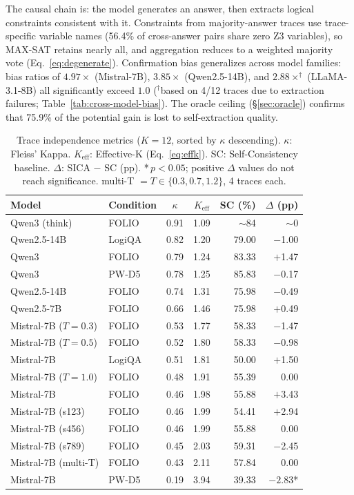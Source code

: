 The causal chain is: the model generates an answer, then extracts logical constraints consistent with it. Constraints from majority-answer traces use trace-specific variable names (56.4\% of cross-answer pairs share zero Z3 variables), so MAX-SAT retains nearly all, and aggregation reduces to a weighted majority vote (Eq.~\ref{eq:degenerate}). Confirmation bias generalizes across model families: bias ratios of $4.97\times$ (Mistral-7B), $3.85\times$ (Qwen2.5-14B), and $2.88{\times}^{\dag}$ (LLaMA-3.1-8B) all significantly exceed $1.0$ ($^{\dag}$based on 4/12 traces due to extraction failures; Table~\ref{tab:cross-model-bias}). The oracle ceiling (\S\ref{sec:oracle}) confirms that 75.9\% of the potential gain is lost to self-extraction quality.

\begin{table}[t]
\centering
\small
\caption{Trace independence metrics ($K = 12$, sorted by $\kappa$ descending). $\kappa$: Fleiss' Kappa. $K_{\text{eff}}$: Effective-K (Eq.~\ref{eq:effk}). SC: Self-Consistency baseline. $\Delta$: SICA $-$ SC (pp). {*}\,$p < 0.05$; positive $\Delta$ values do not reach significance. multi-T $= T \in \{0.3, 0.7, 1.2\}$, 4 traces each.}
\label{tab:independence}
\begin{tabular}{@{}llccrr@{}}
\toprule
Model & Condition & $\kappa$ & $K_{\text{eff}}$ & SC (\%) & $\Delta$ (pp) \\
\midrule
Qwen3 (think) & FOLIO & 0.91 & 1.09 & ${\sim}$84 & ${\sim}$0 \\
Qwen2.5-14B & LogiQA & 0.82 & 1.20 & 79.00 & $-$1.00 \\
Qwen3 & FOLIO & 0.79 & 1.24 & 83.33 & $+$1.47 \\
Qwen3 & PW-D5 & 0.78 & 1.25 & 85.83 & $-$0.17 \\
Qwen2.5-14B & FOLIO & 0.74 & 1.31 & 75.98 & $-$0.49 \\
Qwen2.5-7B & FOLIO & 0.66 & 1.46 & 75.98 & $+$0.49 \\
\addlinespace
Mistral-7B ($T{=}0.3$) & FOLIO & 0.53 & 1.77 & 58.33 & $-$1.47 \\
Mistral-7B ($T{=}0.5$) & FOLIO & 0.52 & 1.80 & 58.33 & $-$0.98 \\
Mistral-7B & LogiQA & 0.51 & 1.81 & 50.00 & $+$1.50 \\
Mistral-7B ($T{=}1.0$) & FOLIO & 0.48 & 1.91 & 55.39 & 0.00 \\
Mistral-7B & FOLIO & 0.46 & 1.98 & 55.88 & $+$3.43 \\
Mistral-7B (s123) & FOLIO & 0.46 & 1.99 & 54.41 & $+$2.94 \\
Mistral-7B (s456) & FOLIO & 0.46 & 1.99 & 55.88 & 0.00 \\
Mistral-7B (s789) & FOLIO & 0.45 & 2.03 & 59.31 & $-$2.45 \\
Mistral-7B (multi-T) & FOLIO & 0.43 & 2.11 & 57.84 & 0.00 \\
Mistral-7B & PW-D5 & 0.19 & 3.94 & 39.33 & $\mathbf{-2.83}${*} \\
\bottomrule
\end{tabular}
\end{table}


